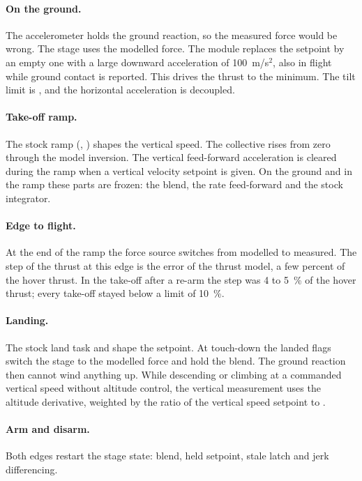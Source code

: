 \paragraph{On the ground.}
The accelerometer holds the ground reaction, so the measured force would be wrong.
The stage uses the modelled force.
The module replaces the setpoint by an empty one with a large downward acceleration of 100~m/s$^2$, also in flight while ground contact is reported.
This drives the thrust to the minimum.
The tilt limit is , and the horizontal acceleration is decoupled.

\paragraph{Take-off ramp.}
The stock ramp (, ) shapes the vertical speed.
The collective rises from zero through the model inversion.
The vertical feed-forward acceleration is cleared during the ramp when a vertical velocity setpoint is given.
On the ground and in the ramp these parts are frozen: the blend, the rate feed-forward and the stock integrator.

\paragraph{Edge to flight.}
At the end of the ramp the force source switches from modelled to measured.
The step of the thrust at this edge is the error of the thrust model, a few percent of the hover thrust.
In the take-off after a re-arm the step was 4 to 5~\% of the hover thrust; every take-off stayed below a limit of 10~\%.

\paragraph{Landing.}
The stock land task and  shape the setpoint.
At touch-down the landed flags switch the stage to the modelled force and hold the blend.
The ground reaction then cannot wind anything up.
While descending or climbing at a commanded vertical speed without altitude control, the vertical measurement uses the altitude derivative, weighted by the ratio of the vertical speed setpoint to .

\paragraph{Arm and disarm.}
Both edges restart the stage state: blend, held setpoint, stale latch and jerk differencing.

